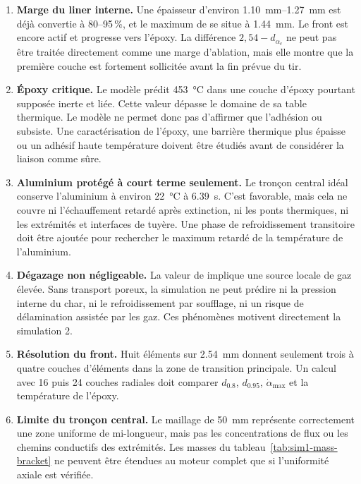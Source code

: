 \documentclass[oneside,openany]{amsdtx}
\begin{document}
\begin{enumerate}[leftmargin=2.2em,label=\textbf{\arabic*.}]
  \item \textbf{Marge du liner interne.} Une épaisseur d'environ
  \SIrange{1.10}{1.27}{mm} est déjà convertie à 80--95\,\%, et le maximum de
   se situe à \SI{1.44}{mm}. Le front est encore actif et progresse
  vers l'époxy. La différence \(2{,}54-d_{\alpha_c}\) ne peut pas être traitée
  directement comme une marge d'ablation, mais elle montre que la première
  couche est fortement sollicitée avant la fin prévue du tir.

  \item \textbf{Époxy critique.} Le modèle prédit
  \SI{453}{\degreeCelsius} dans une couche d'époxy pourtant supposée inerte et
  liée. Cette valeur dépasse le domaine de sa table thermique. Le modèle ne
  permet donc pas d'affirmer que l'adhésion  ou
   subsiste. Une caractérisation de l'époxy, une barrière
  thermique plus épaisse ou un adhésif haute température doivent être étudiés
  avant de considérer la liaison comme sûre.

  \item \textbf{Aluminium protégé à court terme seulement.} Le tronçon central
  idéal conserve l'aluminium à environ \SI{22}{\degreeCelsius} à
  \SI{6.39}{s}. C'est favorable, mais cela ne couvre ni l'échauffement retardé
  après extinction, ni les ponts thermiques, ni les extrémités et interfaces de
  tuyère. Une phase de refroidissement transitoire doit être ajoutée pour
  rechercher le maximum retardé de la température de l'aluminium.

  \item \textbf{Dégazage non négligeable.} La valeur de  implique
  une source locale de gaz élevée. Sans transport poreux, la simulation ne peut
  prédire ni la pression interne du char, ni le refroidissement par soufflage,
  ni un risque de délamination assistée par les gaz. Ces phénomènes motivent
  directement la simulation 2.

  \item \textbf{Résolution du front.} Huit éléments sur \SI{2.54}{mm} donnent
  seulement trois à quatre couches d'éléments dans la zone de transition
  principale. Un calcul avec 16 puis 24 couches radiales doit comparer
  \(d_{0.8}\), \(d_{0.95}\), \(\dot\alpha_\mathrm{max}\) et la température de
  l'époxy.

  \item \textbf{Limite du tronçon central.} Le maillage de \SI{50}{mm}
  représente correctement une zone uniforme de mi-longueur, mais pas les
  concentrations de flux ou les chemins conductifs des extrémités. Les masses
  du tableau~\ref{tab:sim1-mass-bracket} ne peuvent être étendues au moteur
  complet que si l'uniformité axiale est vérifiée.
\end{enumerate}
\end{document}
